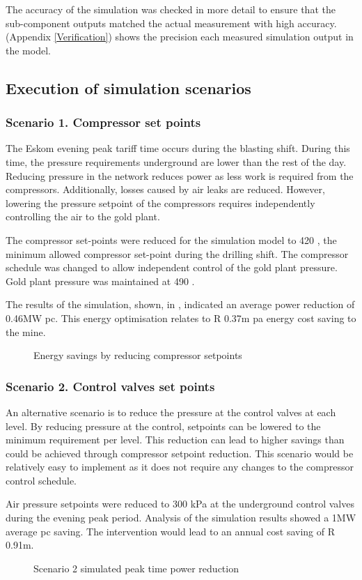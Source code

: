 \par
The accuracy of the simulation was checked in more detail to ensure that the sub-component outputs matched the actual measurement with high accuracy. (Appendix \ref{Verification}) shows the precision each measured simulation output in the model.
\subsection{Execution of simulation scenarios}
\subsubsection{Scenario 1. Compressor set points}
The Eskom evening peak tariff time occurs during the blasting shift. During this time, the pressure requirements underground are lower than the rest of the day. Reducing pressure in the network reduces power as less work is required from the compressors. Additionally, losses caused by air leaks are reduced. However, lowering the pressure setpoint of the compressors requires independently controlling the air to the gold plant. 
\par 
The compressor set-points were reduced for the simulation model to 420 , the minimum allowed compressor set-point during the drilling shift. The compressor schedule was changed to allow independent control of the gold plant pressure. Gold plant pressure was maintained at 490 . 
\par 
The results of the simulation, shown, in , indicated an average power reduction of 0.46MW \gls{pc}. This energy optimisation relates to R 0.37m \gls{pa} energy cost saving to the mine.
\clearpage 
\begin{figure}[!htbp]
	\centering
	
	\caption{Energy savings by reducing compressor setpoints}
	\label{fig: CompSetpoints Results Beatrix}
\end{figure}

\subsubsection{Scenario 2. Control valves set points}
An alternative scenario is to reduce the pressure at the control valves at each level. By reducing pressure at the control, setpoints can be lowered to the minimum requirement per level. This reduction can lead to higher savings than could be achieved through compressor setpoint reduction. This scenario would be relatively easy to implement as it does not require any changes to the compressor control schedule.
\par 
Air pressure setpoints were reduced to 300 kPa at the underground control valves during the evening peak period. Analysis of the simulation results showed a 1MW average \gls{pc} saving. The intervention would lead to an annual cost saving of R 0.91m.
\begin{figure}[h!]
	\centering
	
	\caption{Scenario 2 simulated peak time power reduction}
	\label{fig: Control Valve Results Beatrix}
\end{figure}
